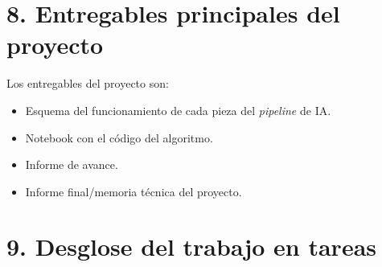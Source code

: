 \documentclass[
11pt, %
codirector, %
]{charter}
\begin{document}
\section{8. Entregables principales del proyecto}
\label{sec:entregables}

Los entregables del proyecto son:

\begin{itemize}
	\item Esquema del funcionamiento de cada pieza del \textit{pipeline} de IA.
	\item Notebook con el código del algoritmo.
	\item Informe de avance.
	\item Informe final/memoria técnica del proyecto.
\end{itemize}

\section{9. Desglose del trabajo en tareas}
\label{sec:wbs}
\end{document}

